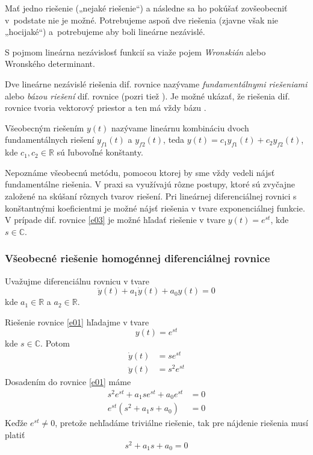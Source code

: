\documentclass[a4paper, 10pt, ]{article}
\begin{document}
Mať jedno riešenie („nejaké riešenie“) a následne sa ho pokúšať zovšeobecniť v~podstate nie je možné. Potrebujeme aspoň dve riešenia (zjavne však nie „hocijaké“) a~potrebujeme aby boli lineárne nezávislé.

S pojmom lineárna nezávislosť funkcií sa viaže pojem \emph{Wronskián} alebo Wronského determinant. 

Dve lineárne nezávislé riešenia dif. rovnice nazývame \emph{fundamentálnymi riešeniami} alebo \emph{bázou riešení} dif. rovnice (pozri tiež \cite{Kuben1995}). Je možné ukázať, že riešenia dif. rovnice tvoria vektorový priestor a ten má vždy bázu \cite{Kuben1995}.

Všeobecným riešením $y(t)$ nazývame lineárnu kombináciu dvoch fundamentálnych riešení $y_{f1}(t)$ a $y_{f2}(t)$, teda $y(t) = c_1 y_{f1}(t) + c_2 y_{f2}(t)$, kde $c_1, c_2 \in \mathbb R$ sú ľubovoľné konštanty.


Nepoznáme všeobecnú metódu, pomocou ktorej by sme vždy vedeli nájsť fundamentálne riešenia. V praxi sa využívajú rôzne postupy, ktoré sú zvyčajne založené na skúšaní rôznych tvarov riešení. Pri lineárnej diferenciálnej rovnici s konštantnými koeficientmi je možné nájsť riešenia v tvare exponenciálnej funkcie. V prípade dif. rovnice \eqref{e03} je možné hľadať riešenie v tvare $y(t) = e^{s t}$, kde $s \in \mathbb C$.




\subsubsection{Všeobecné riešenie homogénnej diferenciálnej rovnice}


Uvažujme diferenciálnu rovnicu v tvare
\begin{equation}
    \ddot y(t) + a_1 \dot y(t) + a_0 y(t) = 0 \label{e01}
\end{equation}
kde $a_1 \in \mathbb R$ a $a_2  \in \mathbb R$.

Riešenie rovnice \eqref{e01} hľadajme v tvare 
\begin{equation}
    y(t) = e^{s t}
\end{equation}
kde $s \in \mathbb C$. Potom
\begin{align}
    \dot y(t) &= s e^{s t} \\
    \ddot y(t) &= s^2 e^{s t}
\end{align}
Dosadením do rovnice \eqref{e01} máme
\begin{subequations}
    \begin{align}
        s^2 e^{s t} + a_1 s e^{s t} + a_0 e^{s t} &= 0 \\
        e^{s t} (s^2 + a_1 s + a_0) &= 0
    \end{align}
\end{subequations}
Keďže $e^{s t} \neq 0$, pretože nehľadáme triviálne riešenie, tak pre nájdenie riešenia musí platiť
\begin{equation}
    s^2 + a_1 s + a_0 = 0 \label{e02}
\end{equation}
\end{document}
